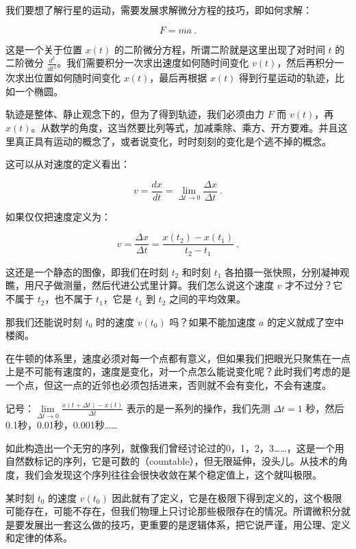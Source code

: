 我们要想了解行星的运动，需要发展求解微分方程的技巧，即如何求解：

\begin{equation}
F=ma~.
\end{equation}


这是一个关于位置 $x(t)$ 的二阶微分方程，所谓二阶就是这里出现了对时间 $t$ 的二阶微分 $\frac{d^2 }{ dt^2 }$。我们需要积分一次求出速度如何随时间变化 $v(t)$，然后再积分一次求出位置如何随时间变化 $x(t)$，最后再根据 $x(t)$ 得到行星运动的轨迹，比如一个椭圆。

轨迹是整体、静止观念下的，但为了得到轨迹，我们必须由力 $F$ 而 $v(t)$，再 $x(t)$。从数学的角度，这当然要比列等式，加减乘除、乘方、开方要难。并且这里真正具有运动的概念了，或者说变化，时时刻刻的变化是个逃不掉的概念。

这可以从对速度的定义看出：

\begin{equation}
v = \frac{d x }{d t} = \lim\limits_{\Delta t \to 0} \frac{\Delta x}{\Delta t}~.
\end{equation}

如果仅仅把速度定义为：

\begin{equation}
v = \frac{\Delta x}{\Delta t} = \frac{ x(t_2) - x(t_1) }{ t_2 - t_1 }~.
\end{equation}

这还是一个静态的图像，即我们在时刻 $t_2$ 和时刻 $t_1$ 各拍摄一张快照，分别凝神观瞧，用尺子做测量，然后代进公式里计算。我们怎么说这个速度 $v$ 才不过分？它不属于 $t_2$，也不属于 $t_1$，它是 $t_1$ 到 $t_2$ 之间的平均效果。

那我们还能说时刻 $t_0$ 时的速度 $v(t_0)$ 吗？如果不能加速度 $a$ 的定义就成了空中楼阁。

在牛顿的体系里，速度必须对每一个点都有意义，但如果我们把眼光只聚焦在一点上是不可能有速度的，速度是变化，对一个点怎么能说变化呢？此时我们考虑的是一个点，但这一点的近邻也必须包括进来，否则就不会有变化，不会有速度。

记号：$\lim\limits_{\Delta t \to 0} \frac{ x(t + \Delta t) - x(t) }{\Delta t}$ 表示的是一系列的操作，我们先测 $\Delta t = 1$ 秒，然后0.1秒，0.01秒，0.001秒……

如此构造出一个无穷的序列，就像我们曾经讨论过的0，1，2，3……，这是一个用自然数标记的序列，它是可数的（countable），但无限延伸，没头儿。从技术的角度，我们会发现这个序列往往会很快收敛在某个稳定值上，这个就叫极限。


某时刻 $t_0$ 的速度 $v(t_0)$ 因此就有了定义，它是在极限下得到定义的，这个极限可能存在，可能不存在，但我们物理上只讨论那些极限存在的情况。所谓微积分就是要发展出一套这么做的技巧，更重要的是逻辑体系，把它说严谨，用公理、定义和定律的体系。

